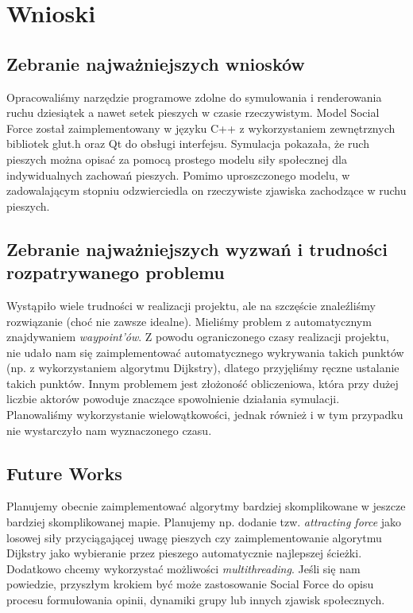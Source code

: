 \chapter{Wnioski}
\section{Zebranie najważniejszych wniosków}
\hspace{4ex}Opracowaliśmy narzędzie programowe zdolne do symulowania i renderowania ruchu dziesiątek a nawet setek pieszych w czasie rzeczywistym. Model Social Force został zaimplementowany w języku C++ z wykorzystaniem zewnętrznych bibliotek glut.h oraz Qt do obsługi interfejsu. Symulacja pokazała, że ruch pieszych można opisać za pomocą prostego modelu siły społecznej dla indywidualnych zachowań pieszych. Pomimo uproszczonego modelu, w zadowalającym stopniu odzwierciedla on rzeczywiste zjawiska zachodzące w ruchu pieszych.

\section{Zebranie najważniejszych wyzwań i trudności rozpatrywanego problemu}
\hspace{4ex}Wystąpiło wiele trudności w realizacji projektu, ale na szczęście znaleźliśmy rozwiązanie (choć nie zawsze idealne). Mieliśmy problem z automatycznym znajdywaniem \emph{waypoint'ów}. Z powodu ograniczonego czasy realizacji projektu, nie udało nam się zaimplementować automatycznego wykrywania takich punktów (np. z wykorzystaniem algorytmu Dijkstry), dlatego przyjęliśmy ręczne ustalanie takich punktów. Innym problemem jest złożoność obliczeniowa, która przy dużej liczbie aktorów powoduje znaczące spowolnienie działania symulacji. Planowaliśmy wykorzystanie wielowątkowości, jednak również i w tym przypadku nie wystarczyło nam wyznaczonego czasu.
\section{Future Works}
\hspace{4ex}Planujemy obecnie zaimplementować algorytmy bardziej skomplikowane w jeszcze bardziej skomplikowanej mapie. Planujemy np. dodanie tzw. \emph{attracting force} jako losowej siły przyciągającej uwagę pieszych czy zaimplementowanie algorytmu Dijkstry jako wybieranie przez pieszego automatycznie najlepszej ścieżki. Dodatkowo chcemy wykorzystać możliwości \emph{multithreading}.  Jeśli się nam powiedzie, przyszłym krokiem być może zastosowanie Social Force do opisu procesu formułowania opinii, dynamiki grupy lub innych zjawisk społecznych.